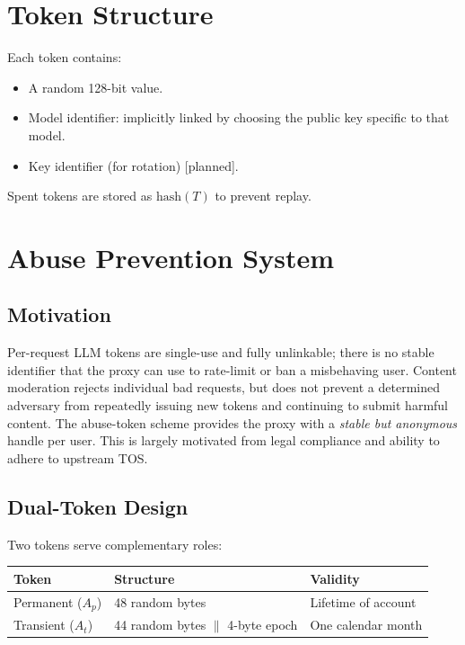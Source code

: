 \documentclass[11pt,a4paper]{article}
\begin{document}
\section{Token Structure}

Each token contains:
\begin{itemize}
  \item A random 128-bit value.
  \item Model identifier: implicitly linked by choosing the public key specific to that model.
  \item Key identifier (for rotation) [planned].
\end{itemize}
Spent tokens are stored as $\mathrm{hash}(T)$ to prevent replay.

\section{Abuse Prevention System}
\label{sec:abuse}

\subsection{Motivation}

Per-request LLM tokens are single-use and fully unlinkable; there is no stable identifier that the proxy
can use to rate-limit or ban a misbehaving user. Content moderation rejects individual bad requests, but
does not prevent a determined adversary from repeatedly issuing new tokens and continuing to submit
harmful content. The abuse-token scheme provides the proxy with a \emph{stable but anonymous} handle
per user. This is largely motivated from legal compliance and ability to adhere to upstream TOS.

\subsection{Dual-Token Design}

Two tokens serve complementary roles:

\begin{center}
\renewcommand{\arraystretch}{1.4}
\begin{tabular}{@{}lll@{}}
\toprule
\textbf{Token} & \textbf{Structure} & \textbf{Validity} \\
\midrule
Permanent ($A_p$) & 48 random bytes & Lifetime of account \\
Transient ($A_t$) & 44 random bytes $\|$ 4-byte epoch & One calendar month \\
\bottomrule
\end{tabular}
\end{center}
\end{document}
